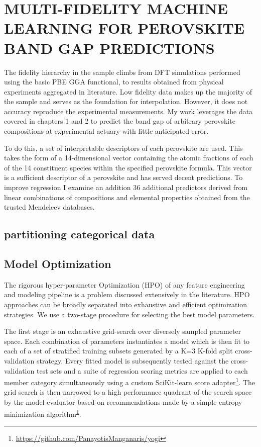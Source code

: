 \chapter{MULTI-FIDELITY MACHINE LEARNING FOR PEROVSKITE BAND GAP PREDICTIONS}
\label{sec:orgde7d406}

The fidelity hierarchy in the sample climbs from DFT simulations performed using the basic PBE GGA functional, to results obtained from physical experiments aggregated in literature.
\autocite{almora-2020-devic-perfor,kim-2014-cdses-nanow,swanson-2017-co-sublim}
Low fidelity data makes up the majority of the sample and serves as the foundation for interpolation.
However, it does not accuracy reproduce the experimental measurements.
My work leverages the data covered in chapters 1 and 2 to predict the band gap of arbitrary perovskite compositions at experimental actuary with little anticipated error.

To do this, a set of interpretable descriptors of each perovskite are used.
This takes the form of a 14-dimensional vector containing the atomic fractions of each of the 14 constituent species within the specified perovskite formula.
This vector is a sufficient descriptor of a perovskite and has served decent predictions.
\autocite{mannodi-kanakkithodi-2022-data-driven}
To improve regression I examine an addition 36 additional predictors derived from linear combinations of compositions and elemental properties obtained from the trusted Mendeleev databases.
\autocite{mentel-2014}

\section{partitioning categorical data}
\label{sec:orgfa8b6f4}
\section{Model Optimization}
\label{sec:orgd11793f}
The rigorous hyper-parameter Optimization (HPO) of any feature engineering and modeling pipeline is a problem discussed extensively in the literature.
HPO approaches can be broadly separated into exhaustive and efficient optimization strategies.
\autocite{yang-2020-hyper-optim}
We use a two-stage procedure for selecting the best model parameters.

The first stage is an exhaustive grid-search over diversely sampled parameter space.
Each combination of parameters instantiates a model which is then fit to each of a set of stratified training subsets generated by a K=3 K-fold split cross-validation strategy.
Every fitted model is subsequently tested against the cross-validation test sets and a suite of regression scoring metrics are applied to each member category simultaneously using a custom SciKit-learn score adapter\footnote{\url{https://github.com/PanayotisManganaris/yogi}\label{org1cc6293}}.
The grid search is then narrowed to a high performance quadrant of the search space by the model evaluator based on recommendations made by a simple entropy minimization algorithm\textsuperscript{\ref{org1cc6293}}.

